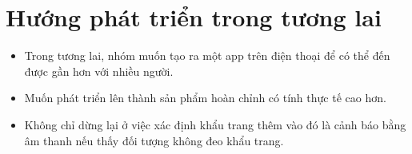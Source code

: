 \section{Hướng phát triển trong tương lai}

\begin{itemize}
	\item Trong tương lai, nhóm muốn tạo ra một app trên điện thoại để có thể đến được gần hơn với nhiều người. 
	
	\item Muốn phát triển lên thành sản phẩm hoàn chỉnh có tính thực tế cao hơn.	
	
	\item Không chỉ dừng lại ở việc xác định khẩu trang thêm vào đó là cảnh báo bằng âm thanh nếu thấy đối tượng không đeo khẩu trang. 
\end{itemize}



